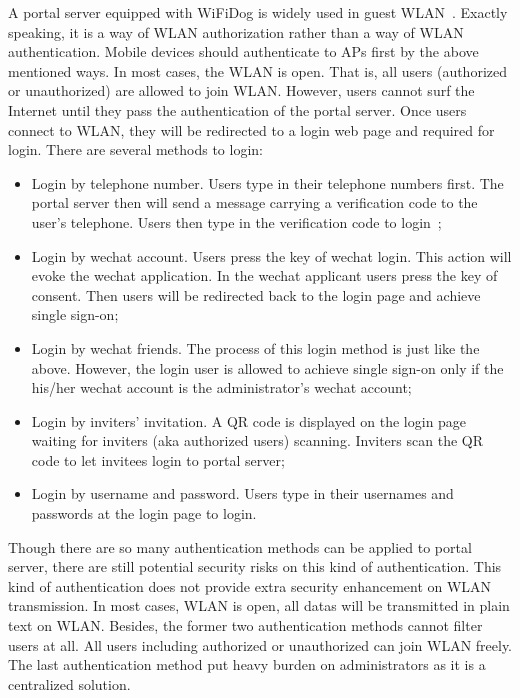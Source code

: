 A portal server equipped with WiFiDog is widely used in guest WLAN~\cite{Lenczner2005Wireless}. Exactly speaking, it is a way of WLAN authorization rather than a way of WLAN authentication. Mobile devices should authenticate to APs first by the above mentioned ways. In most cases, the WLAN is open. That is, all users (authorized or unauthorized) are allowed to join WLAN. However, users cannot surf the Internet until they pass the authentication of the portal server. Once users connect to WLAN, they will be redirected to a login web page and required for login. There are several methods to login: 
\begin{itemize}
    \item Login by telephone number. Users type in their telephone numbers first. The portal server then will send a message carrying a verification code to the user’s telephone. Users then type in the verification code to login~\cite{Hallsteinsen2007Using}; 
    \item Login by wechat account. Users press the key of wechat login. This action will evoke the wechat application. In the wechat applicant users press the key of consent. Then users will be redirected back to the login page and achieve single sign-on; 
    \item Login by wechat friends. The process of this login method is just like the above. However, the login user is allowed to achieve single sign-on only if the his/her wechat account is the administrator’s wechat account;
     \item 	Login by inviters’ invitation. A QR code is displayed on the login page waiting for inviters (aka authorized users) scanning. Inviters scan the QR code to let invitees login to portal server;
     \item Login by username and password. Users type in their usernames and passwords at the login page to login.
\end{itemize}


Though there are so many authentication methods can be applied to portal server, there are still potential security risks on this kind of authentication. This kind of authentication does not provide extra security enhancement on WLAN transmission. In most cases, WLAN is open, all datas will be transmitted in plain text on WLAN. Besides, the former two authentication methods cannot filter users at all. All users including authorized or unauthorized can join WLAN freely. The last authentication method put heavy burden on administrators as it is a centralized solution.  

